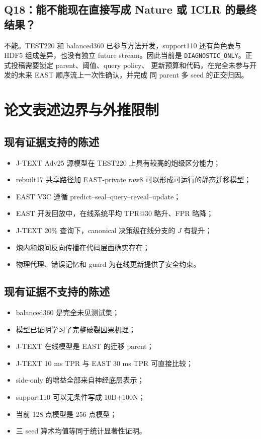 \documentclass[11pt,a4paper]{article}
\newcommand{\code}[1]{\texttt{\small #1}}
\begin{document}
\subsection*{Q18：能不能现在直接写成 Nature 或 ICLR 的最终结果？}

不能。TEST220 和 balanced360 已参与方法开发，support110 还有角色表与
HDF5 组成差异，也没有独立 future stream。因此当前是
\code{DIAGNOSTIC\_ONLY}。正式投稿需要锁定 parent、阈值、query policy、
更新预算和代码，在完全未参与开发的未来 EAST 顺序流上一次性确认，并完成
同 parent 多 seed 的正交归因。

\section{论文表述边界与外推限制}

\subsection{现有证据支持的陈述}

\begin{itemize}
\item J-TEXT Adv25 源模型在 TEST220 上具有较高的炮级区分能力；
\item rebuilt17 共享路径加 EAST-private raw8 可以形成可运行的静态迁移模型；
\item EAST V3C 遵循 predict--seal--query--reveal--update；
\item EAST 开发回放中，在线系统平均 TPR@30 略升、FPR 略降；
\item J-TEXT 20\% 查询下，canonical 决策级在线分支的 \(J\) 有提升；
\item 炮内和炮间反向传播在代码层面确实存在；
\item 物理代理、错误记忆和 guard 为在线更新提供了安全约束。
\end{itemize}

\subsection{现有证据不支持的陈述}

\begin{itemize}
\item balanced360 是完全未见测试集；
\item 模型已证明学习了完整破裂因果机理；
\item J-TEXT 在线模型是 EAST 的迁移 parent；
\item J-TEXT 10 ms TPR 与 EAST 30 ms TPR 可直接比较；
\item side-only 的增益全部来自神经底层表示；
\item support110 可以无条件写成 10D+100N；
\item 当前 128 点模型是 256 点模型；
\item 三 seed 算术均值等同于统计显著性证明。
\end{itemize}
\end{document}
